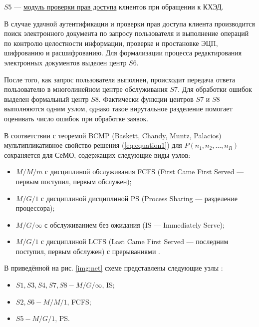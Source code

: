 \vspace{\baselineskip}
$S5$ --- \underline{модуль проверки прав доступа} клиентов при обращении к КХЭД.

\vspace{\baselineskip}
В случае удачной аутентификации и проверки прав доступа клиента производится поиск электронного документа по запросу пользователя и выполнение операций по контролю целостности информации, проверке и простановке ЭЦП, шифрованию и расшифрованию. Для формализации процесса редактирования электронных документов выделен центр $S6$.

После того, как запрос пользователя выполнен, происходит передача ответа пользователю в многолинейном центре обслуживания $S7$.
Для обработки ошибок выделен формальный центр $S8$. Фактически функции центров $S7$ и $S8$ выполняются одним узлом, однако такое вирутальное разделение помогает оценивать число ошибок при обработке заявок.

\vspace{\baselineskip}
В соответствии с теоремой BCMP (Baskett, Chandy, Muntz, Palacios) мультипликативное свойство решения (\ref{eq:equation1}) для $P(n_1,n_2,\ldots,n_R)$ сохраняется для СеМО, содержащих следующие виды узлов:
\begin{itemize}
  \item $M/M/m$ с дисциплиной обслуживания FCFS (First Came First Served --- первым поступил, первым обслужен);
  \item $M/G/1$ с дисциплиной дисциплиной PS (Process Sharing --- разделение процессора);
  \item $M/G/\infty$ с обслуживанием без ожидания (IS --- Immediately Serve);
  \item $M/G/1$ с дисциплиной LCFS (Last Came First Served --- последним поступил, первым обслужен) с прерываниями \cite{vishnevsky}.
\end{itemize}

В приведённой на рис. \ref{img:net} схеме представлены следующие узлы \cite{bykov}:
\begin{itemize}
  \item $S1, S3, S4, S7, S8 - M/G/\infty$, IS;
  \item $S2, S6 - M/M/1$, FCFS;
  \item $S5 - M/G/1$, PS.
\end{itemize}

